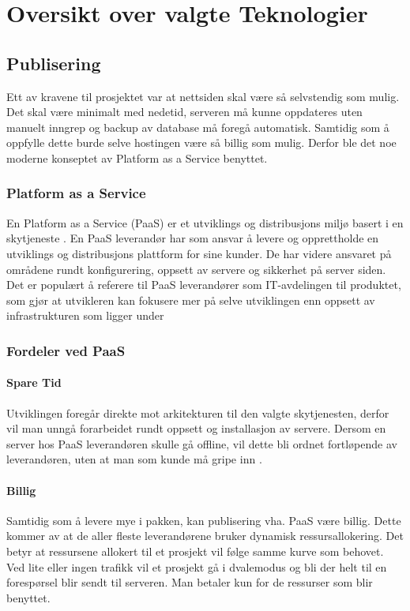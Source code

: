 \chapter{Oversikt over valgte Teknologier}

\section{Publisering}
Ett av kravene til prosjektet var at nettsiden skal være så selvstendig som mulig. Det skal være minimalt med nedetid, serveren må kunne oppdateres uten manuelt inngrep og backup av database må foregå automatisk. Samtidig som å oppfylle dette burde selve hostingen være så billig som mulig. Derfor ble det noe moderne konseptet av Platform as a Service benyttet.

\subsection{Platform as a Service}
En Platform as a Service (PaaS) er et utviklings og distribusjons miljø basert i en skytjeneste \cite{ paas:azure}. En PaaS leverandør har som ansvar å levere og opprettholde en utviklings og distribusjons plattform for sine kunder. De har videre ansvaret på områdene rundt konfigurering, oppsett av servere og sikkerhet på server siden. Det er populært å referere til  PaaS leverandører som IT-avdelingen til produktet, som gjør at utvikleren kan fokusere mer på selve utviklingen enn oppsett av infrastrukturen som ligger under \cite[s. 10]{bachelor}

\subsection{Fordeler ved PaaS}
\subsubsection*{Spare Tid}
Utviklingen foregår direkte mot arkitekturen til den valgte skytjenesten, derfor vil man unngå forarbeidet rundt oppsett og installasjon av servere. Dersom en server hos PaaS leverandøren skulle gå offline, vil dette bli ordnet fortløpende av leverandøren, uten at man som kunde må gripe inn \cite[s. 9]{bachelor}.

\subsubsection*{Billig}
Samtidig som å levere mye i pakken, kan publisering vha. PaaS være billig. Dette kommer av at de aller fleste leverandørene bruker dynamisk ressursallokering. Det betyr at ressursene allokert til et prosjekt vil følge samme kurve som behovet. Ved lite eller ingen trafikk vil et prosjekt gå i dvalemodus og bli der helt til en forespørsel blir sendt til serveren. Man betaler kun for de ressurser som blir benyttet.

